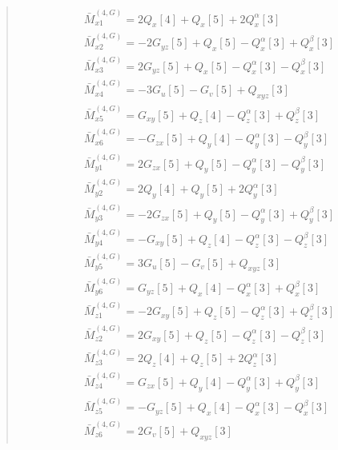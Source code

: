 \documentclass[fleqn,10pt]{jsarticle}
\begin{document}
\begin{quote}
\begin{align*}
& \bar{M}^{(4,G)}_{x1} = 2 Q_{x}[4] + Q_{x}[5] + 2 Q_{x}^{\alpha}[3] \\
& \bar{M}^{(4,G)}_{x2} = - 2 G_{yz}[5] + Q_{x}[5] - Q_{x}^{\alpha}[3] + Q_{x}^{\beta}[3] \\
& \bar{M}^{(4,G)}_{x3} = 2 G_{yz}[5] + Q_{x}[5] - Q_{x}^{\alpha}[3] - Q_{x}^{\beta}[3] \\
& \bar{M}^{(4,G)}_{x4} = - 3 G_{u}[5] - G_{v}[5] + Q_{xyz}[3] \\
& \bar{M}^{(4,G)}_{x5} = G_{xy}[5] + Q_{z}[4] - Q_{z}^{\alpha}[3] + Q_{z}^{\beta}[3] \\
& \bar{M}^{(4,G)}_{x6} = - G_{zx}[5] + Q_{y}[4] - Q_{y}^{\alpha}[3] - Q_{y}^{\beta}[3] \\
& \bar{M}^{(4,G)}_{y1} = 2 G_{zx}[5] + Q_{y}[5] - Q_{y}^{\alpha}[3] - Q_{y}^{\beta}[3] \\
& \bar{M}^{(4,G)}_{y2} = 2 Q_{y}[4] + Q_{y}[5] + 2 Q_{y}^{\alpha}[3] \\
& \bar{M}^{(4,G)}_{y3} = - 2 G_{zx}[5] + Q_{y}[5] - Q_{y}^{\alpha}[3] + Q_{y}^{\beta}[3] \\
& \bar{M}^{(4,G)}_{y4} = - G_{xy}[5] + Q_{z}[4] - Q_{z}^{\alpha}[3] - Q_{z}^{\beta}[3] \\
& \bar{M}^{(4,G)}_{y5} = 3 G_{u}[5] - G_{v}[5] + Q_{xyz}[3] \\
& \bar{M}^{(4,G)}_{y6} = G_{yz}[5] + Q_{x}[4] - Q_{x}^{\alpha}[3] + Q_{x}^{\beta}[3] \\
& \bar{M}^{(4,G)}_{z1} = - 2 G_{xy}[5] + Q_{z}[5] - Q_{z}^{\alpha}[3] + Q_{z}^{\beta}[3] \\
& \bar{M}^{(4,G)}_{z2} = 2 G_{xy}[5] + Q_{z}[5] - Q_{z}^{\alpha}[3] - Q_{z}^{\beta}[3] \\
& \bar{M}^{(4,G)}_{z3} = 2 Q_{z}[4] + Q_{z}[5] + 2 Q_{z}^{\alpha}[3] \\
& \bar{M}^{(4,G)}_{z4} = G_{zx}[5] + Q_{y}[4] - Q_{y}^{\alpha}[3] + Q_{y}^{\beta}[3] \\
& \bar{M}^{(4,G)}_{z5} = - G_{yz}[5] + Q_{x}[4] - Q_{x}^{\alpha}[3] - Q_{x}^{\beta}[3] \\
& \bar{M}^{(4,G)}_{z6} = 2 G_{v}[5] + Q_{xyz}[3]
\end{align*}
\end{quote}
\end{document}
